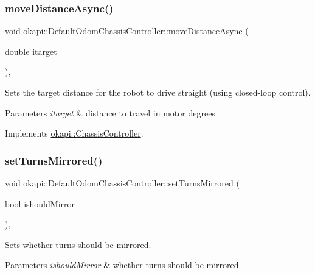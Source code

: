 \subsubsection{\texorpdfstring{moveDistanceAsync()}{moveDistanceAsync()}\hspace{0.1cm}{\footnotesize\ttfamily [2/2]}}
{\footnotesize\ttfamily void okapi\+::\+Default\+Odom\+Chassis\+Controller\+::move\+Distance\+Async (\begin{DoxyParamCaption}\item[{double}]{itarget }\end{DoxyParamCaption})\hspace{0.3cm}{\ttfamily [override]}, {\ttfamily [virtual]}}

Sets the target distance for the robot to drive straight (using closed-\/loop control).


\begin{DoxyParams}{Parameters}
{\em itarget} & distance to travel in motor degrees \\
\hline
\end{DoxyParams}


Implements \mbox{\hyperlink{classokapi_1_1ChassisController_a24b46ec1c42f32c0527d57738a07820a}{okapi\+::\+Chassis\+Controller}}.

\mbox{\label{classokapi_1_1DefaultOdomChassisController_aed92ba0b7a9fc15bf645f3789e8598ae}} 
\subsubsection{\texorpdfstring{setTurnsMirrored()}{setTurnsMirrored()}}
{\footnotesize\ttfamily void okapi\+::\+Default\+Odom\+Chassis\+Controller\+::set\+Turns\+Mirrored (\begin{DoxyParamCaption}\item[{bool}]{ishould\+Mirror }\end{DoxyParamCaption})\hspace{0.3cm}{\ttfamily [override]}, {\ttfamily [virtual]}}

Sets whether turns should be mirrored.


\begin{DoxyParams}{Parameters}
{\em ishould\+Mirror} & whether turns should be mirrored \\
\hline
\end{DoxyParams}


